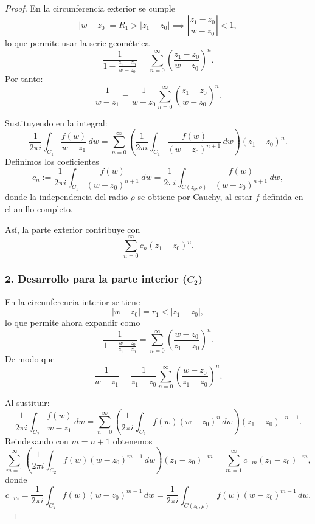 \begin{proof}
    En la circunferencia exterior se cumple
    \[
        |w-z_0| = R_1 > |z_1 - z_0| \implies \left|
        \frac{z_1 - z_0}{w - z_0} \right| < 1,
    \]
    lo que permite usar la serie geométrica
    \[
        \frac{1}{1 - \frac{z_1 - z_0}{w - z_0}}
        = \sum_{n=0}^{\infty}
          \left( \frac{z_1 - z_0}{w - z_0} \right)^n.
    \]
    Por tanto:
    \[
        \frac{1}{w - z_1}
        = \frac{1}{w - z_0}
          \sum_{n=0}^{\infty}
          \left( \frac{z_1 - z_0}{w - z_0} \right)^n.
    \]

    Sustituyendo en la integral:
    \[
        \frac{1}{2\pi i} \int_{C_1} \frac{f(w)}{w - z_1}\, dw
        = \sum_{n=0}^{\infty}
          \left(
          \frac{1}{2\pi i}
          \int_{C_1} 
          \frac{f(w)}{(w - z_0)^{n+1}}\, dw
          \right)
          (z_1 - z_0)^n.
    \]
    Definimos los coeficientes
    \[
        c_n :=
        \frac{1}{2\pi i}
        \int_{C_1} \frac{f(w)}{(w - z_0)^{n+1}}\, dw
        = \frac{1}{2\pi i}
        \int_{C(z_0,\rho)} \frac{f(w)}{(w - z_0)^{n+1}}\, dw,
    \]
    donde la independencia del radio $\rho$ se obtiene por Cauchy, al estar $f$ definida en el anillo completo.

    Así, la parte exterior contribuye con
    \[
        \sum_{n=0}^{\infty} c_n (z_1 - z_0)^n.
    \]

    \subsubsection*{2. Desarrollo para la parte interior ($C_2$)}

    En la circunferencia interior se tiene
    \[
        |w - z_0| = r_1 < |z_1 - z_0|,
    \]
    lo que permite ahora expandir como
    \[
        \frac{1}{1 - \frac{w - z_0}{z_1 - z_0}}
        = \sum_{n=0}^{\infty}
          \left( \frac{w - z_0}{z_1 - z_0} \right)^n.
    \]
    De modo que
    \[
        \frac{1}{w - z_1}
        = \frac{1}{z_1 - z_0}
          \sum_{n=0}^{\infty}
          \left( \frac{w - z_0}{z_1 - z_0} \right)^n.
    \]

    Al sustituir:
    \[
        \frac{1}{2\pi i} \int_{C_2} \frac{f(w)}{w - z_1}\, dw
        = \sum_{n=0}^{\infty}
          \left(
            \frac{1}{2\pi i}
            \int_{C_2} f(w)(w - z_0)^n\, dw
          \right)
          (z_1 - z_0)^{-n-1}.
    \]
    Reindexando con $m=n+1$ obtenemos
    \[
        \sum_{m=1}^{\infty}
        \left(
        \frac{1}{2\pi i}
        \int_{C_2} f(w)(w - z_0)^{m-1}\, dw
        \right)
        (z_1 - z_0)^{-m}
        = \sum_{m=1}^{\infty} c_{-m}(z_1 - z_0)^{-m},
    \]
    donde
    \[
        c_{-m}
        = \frac{1}{2\pi i}
          \int_{C_2} f(w)(w - z_0)^{m-1}\, dw
        = \frac{1}{2\pi i}
          \int_{C(z_0,\rho)} f(w)(w - z_0)^{m-1}\, dw.
    \]


\end{proof}
